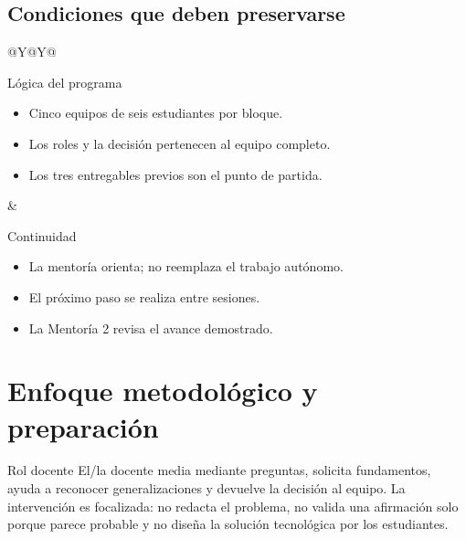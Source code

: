 \documentclass[10pt,a4paper]{article}
\begin{document}
\subsection{Condiciones que deben preservarse}
\begin{tabularx}{\textwidth}{@{}Y@{\hspace{4mm}}Y@{}}
\begin{docbox}[height=43mm]{Lógica del programa}
\begin{itemize}
  \item Cinco equipos de seis estudiantes por bloque.
  \item Los roles y la decisión pertenecen al equipo completo.
  \item Los tres entregables previos son el punto de partida.
\end{itemize}
\end{docbox}
&
\begin{docbox}[height=43mm]{Continuidad}
\begin{itemize}
  \item La mentoría orienta; no reemplaza el trabajo autónomo.
  \item El próximo paso se realiza entre sesiones.
  \item La Mentoría 2 revisa el avance demostrado.
\end{itemize}
\end{docbox}
\end{tabularx}

\newpage
\section{Enfoque metodológico y preparación}

\begin{navybox}{Rol docente}
El/la docente media mediante preguntas, solicita fundamentos, ayuda a reconocer generalizaciones y devuelve la decisión al equipo. La intervención es focalizada: no redacta el problema, no valida una afirmación solo porque parece probable y no diseña la solución tecnológica por los estudiantes.
\end{navybox}
\end{document}
